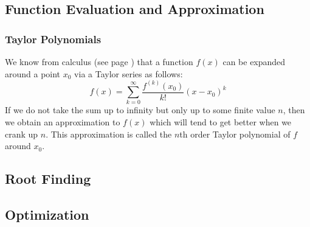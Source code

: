 

\subsection{Function Evaluation and Approximation}

\subsubsection{Taylor Polynomials}
We know from calculus (see page \pageref{Eq:TaylorSeries}) that a function $f(x)$ can be expanded around a point $x_0$ via a Taylor series as follows:
\begin{equation}
f(x) = \sum_{k=0}^\infty \frac{f^{(k)}(x_0)}{k!} (x-x_0)^k
\end{equation}
If we do not take the sum up to infinity but only up to some finite value $n$, then we obtain an approximation to $f(x)$ which will tend to get better when we crank up $n$. This approximation is called the $n$th order Taylor polynomial of $f$ around $x_0$. 







\subsection{Root Finding}

\subsection{Optimization}







\begin{comment}

\end{comment}